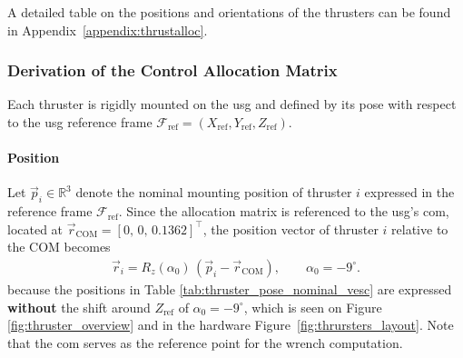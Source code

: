 A detailed table on the positions and orientations of the thrusters can be found in Appendix~\ref{appendix:thrustalloc}.


\subsubsection{Derivation of the Control Allocation Matrix}

Each thruster  is rigidly mounted on the \gls{usg} and defined by its pose with respect to the \gls{usg} reference frame
$\mathcal{F}_{\mathrm{ref}} = (X_{\mathrm{ref}}, Y_{\mathrm{ref}}, Z_{\mathrm{ref}})$.
\paragraph{Position}
Let $\vec{p}_i \in \mathbb{R}^3$ denote the nominal mounting position of thruster $i$ 
expressed in the reference frame $\mathcal{F}_{\mathrm{ref}}$.
Since the allocation matrix is referenced to the \gls{usg}'s \gls{com}, 
located at $\vec{r}_{\mathrm{COM}} = [0, \, 0, \, 0.1362]^\top $, the position vector of thruster $i$ relative to the COM becomes
\begin{align}
\vec{r}_i = R_z(\alpha_0)\,(\vec{p}_i - \vec{r}_{\mathrm{COM}}),
\qquad \alpha_0 = -9^\circ.
\end{align}
because the positions in Table \ref{tab:thruster_pose_nominal_vesc} are expressed \textbf{without }the shift around $Z_{\mathrm{ref}}$ of $\alpha_0 = -9^\circ$, which is seen on Figure \ref{fig:thruster_overview} and in the hardware Figure~\ref{fig:thrursters_layout}. Note that the \gls{com} serves as the reference point for the wrench computation.

